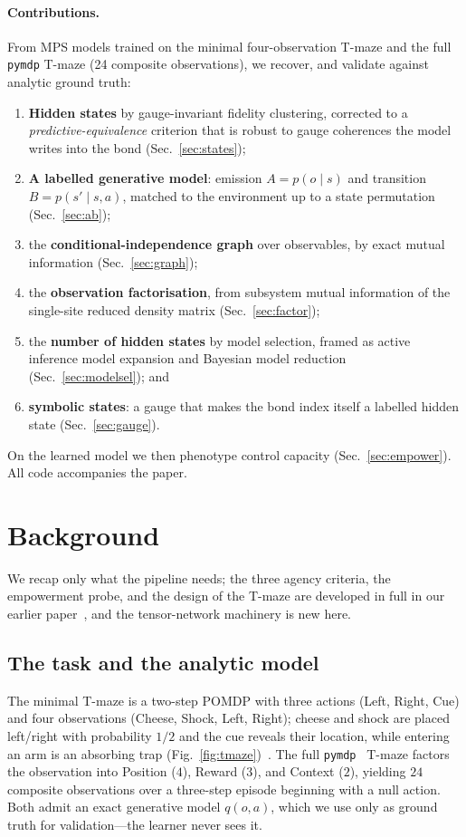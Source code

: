 \documentclass[runningheads]{llncs}
\begin{document}
\paragraph{Contributions.} From MPS models trained on the minimal four-observation
T-maze and the full \texttt{pymdp} T-maze (24 composite observations), we recover, and
validate against analytic ground truth:
\begin{enumerate}
\item \textbf{Hidden states} by gauge-invariant fidelity clustering, corrected to a
\emph{predictive-equivalence} criterion that is robust to gauge coherences the model
writes into the bond (Sec.~\ref{sec:states});
\item \textbf{A labelled generative model}: emission $A=p(o\mid s)$ and transition
$B=p(s'\mid s,a)$, matched to the environment up to a state permutation
(Sec.~\ref{sec:ab});
\item the \textbf{conditional-independence graph} over observables, by exact mutual
information (Sec.~\ref{sec:graph});
\item the \textbf{observation factorisation}, from subsystem mutual information of the
single-site reduced density matrix (Sec.~\ref{sec:factor});
\item the \textbf{number of hidden states} by model selection, framed as active
inference model expansion and Bayesian model reduction (Sec.~\ref{sec:modelsel}); and
\item \textbf{symbolic states}: a gauge that makes the bond index itself a labelled
hidden state (Sec.~\ref{sec:gauge}).
\end{enumerate}
On the learned model we then phenotype control capacity (Sec.~\ref{sec:empower}). All
code accompanies the paper.

\section{Background}\label{sec:background}

We recap only what the pipeline needs; the three agency criteria, the empowerment
probe, and the design of the T-maze are developed in full in our earlier
paper~\cite{wilsonAgency2025}, and the tensor-network machinery is new here.

\subsection{The task and the analytic model}
The minimal T-maze is a two-step POMDP with three actions (Left, Right, Cue) and four
observations (Cheese, Shock, Left, Right); cheese and shock are placed left/right with
probability $1/2$ and the cue reveals their location, while entering an arm is an
absorbing trap (Fig.~\ref{fig:tmaze})~\cite{wilsonAgency2025}. The full
\texttt{pymdp}~\cite{heins2022pymdp} T-maze factors the observation into Position
($4$), Reward ($3$), and Context ($2$), yielding $24$ composite observations over a
three-step episode beginning with a null action. Both admit an exact generative model
$q(o,a)$, which we use only as ground truth for validation---the learner never sees it.
\end{document}
